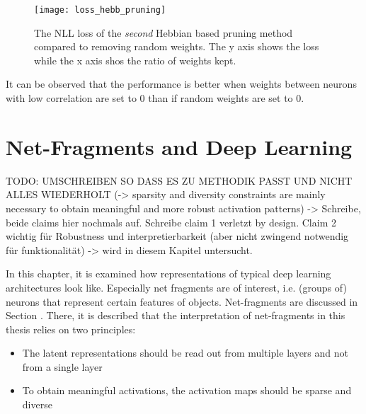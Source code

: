 \begin{figure}[h]
    \centering
    \texttt{[image: loss\_hebb\_pruning]}
    \caption[NLL Loss of Hebbian Pruning]{The NLL loss of the \emph{second} Hebbian based pruning method compared to removing random weights. The y axis shows the loss while the x axis shos the ratio of weights kept. }
\end{figure}

It can be observed that the performance is better when weights between neurons with low correlation are set to \(0\) than if random weights are set to \(0\).


\pagebreak
\chapter{Net-Fragments and Deep Learning}
TODO: UMSCHREIBEN SO DASS ES ZU METHODIK PASST UND NICHT ALLES WIEDERHOLT (-> sparsity and diversity constraints are mainly necessary to obtain meaningful and more robust activation patterns) -> Schreibe, beide claims hier nochmals auf. Schreibe claim 1 verletzt by design. Claim 2 wichtig für Robustness und interpretierbarkeit (aber nicht zwingend notwendig für funktionalität) -> wird in diesem Kapitel untersucht.


In this chapter, it is examined how representations of typical deep learning architectures look like.
Especially net fragments are of interest, i.e. (groups of) neurons that represent certain features of objects.
Net-fragments are discussed in Section .
There, it is described that the interpretation of net-fragments in this thesis relies on two principles:

\begin{itemize}
	\item The latent representations should be read out from multiple layers and not from a single layer
	\item To obtain meaningful activations, the activation maps should be sparse and diverse
\end{itemize}



